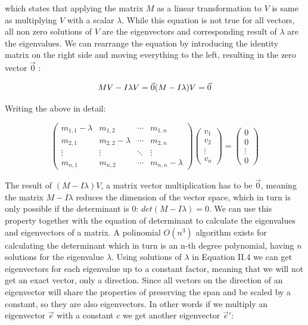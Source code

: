 which states that applying the matrix \(M\) as a linear transformation to \(V\) is same as multiplying \(V\) with a scalar \(\lambda\). While this equation is not true for all vectors, all non zero solutions of \(V\) are the eigenvectors and corresponding result of \(\lambda\) are the eigenvalues. We can rearrange the equation by introducing the identity matrix on the right side and moving everything to the left, resulting in the zero vector \(\vec 0\) :

\[MV - I \lambda V = \vec 0 \\
(M- I\lambda) V = \vec 0\]

Writing the above in detail:

\[\begin{pmatrix}
  m_{1,1} - \lambda & m_{1,2} & \cdots & m_{1,n} \\
  m_{2,1} & m_{2,2} - \lambda & \cdots & m_{2,n} \\
  \vdots  & \vdots  & \ddots & \vdots  \\
  m_{n,1} & m_{n,2} & \cdots & m_{n,n} - \lambda
 \end{pmatrix} \begin{pmatrix} v_{1} \\  v_{2} \\  \vdots\\ v_{n} \end{pmatrix}
= \begin{pmatrix} 0 \\ 0 \\  \vdots\\ 0 \end{pmatrix} \]

The result of \((M- I\lambda) V\), a matrix vector multiplication has to be \(\vec 0\), meaning the matrix \(M- I\lambda\) reduces the dimension of the vector space, which in turn is only possible if the determinant is \(0\): \(det(M- I\lambda) = 0\). We can use this property together with the equation of determinant to calculate the eigenvalues and eigenvectors of a matrix. A polinomial \(O(n^3)\) algorithm exists for calculating the determinant which in turn is an n-th degree polynomial, having \(n\) solutions for the eigenvalue \(\lambda\).  Using solutions of \(\lambda\) in Equation II.4 we can get eigenvectors for each eigenvalue up to a constant factor, meaning that we will not get an exact vector, only a direction. Since all vectors on the direction of an eigenvector will share the properties of preserving the span and be scaled by a constant, so they are also eigenvectors. In other words if we multiply an eigenvector \(\vec e\) with a constant \(c\) we get another eigenvector \(\vec e'\):

